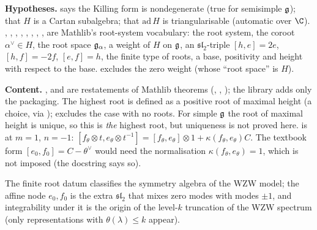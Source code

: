 \begin{dictionary}
\textbf{Hypotheses.}  says the Killing form is nondegenerate (true for
semisimple $\mathfrak{g}$); \allowbreak{} that $H$ is a Cartan subalgebra;
 that $\mathrm{ad}\,H$ is triangularisable (automatic over $\C$). ,
, , , , , ,
,  are Mathlib's root-system vocabulary: the root system, the coroot
$\alpha^\vee\in H$, the root space $\mathfrak{g}_\alpha$, a weight of $H$ on $\mathfrak{g}$, an $\mathfrak{sl}_2$-triple
$[h,e] = 2e$, $[h,f] = -2f$, $[e,f] = h$, the finite type of roots, a base, positivity and height
with respect to the base.  excludes the zero weight (whose ``root space'' is $H$).

\textbf{Content.} , \allowbreak{} and  are
restatements of Mathlib theorems (\allowbreak{}\allowbreak{},
\allowbreak{}\allowbreak{}\allowbreak{}\allowbreak{}, \allowbreak{}); the library adds only the
packaging. The highest root is defined as a positive root of maximal height (a choice, via
\allowbreak{}\allowbreak{}\allowbreak{});  excludes the case with no roots. For simple
$\mathfrak{g}$ the root of maximal height is unique, so this is \emph{the} highest root, but uniqueness is not
proved here. \allowbreak{}\allowbreak{} is  at $m = 1$, $n = -1$:
$[f_\theta\otimes t, e_\theta\otimes t^{-1}] = [f_\theta,e_\theta]\otimes1 + \kappa(f_\theta,e_\theta)C$. The textbook
form $[e_0,f_0] = C-\theta^\vee$ would need the normalisation $\kappa(f_\theta,e_\theta) = 1$, which is not
imposed (the docstring says so).
\end{dictionary}

\begin{physics}
The finite root datum classifies the symmetry algebra of the WZW model; the affine node $e_0,f_0$ is
the extra $\mathfrak{sl}_2$ that mixes zero modes with modes $\pm1$, and integrability under it is the
origin of the level-$k$ truncation of the WZW spectrum (only representations with $\theta(\lambda)\le k$
appear).
\end{physics}

